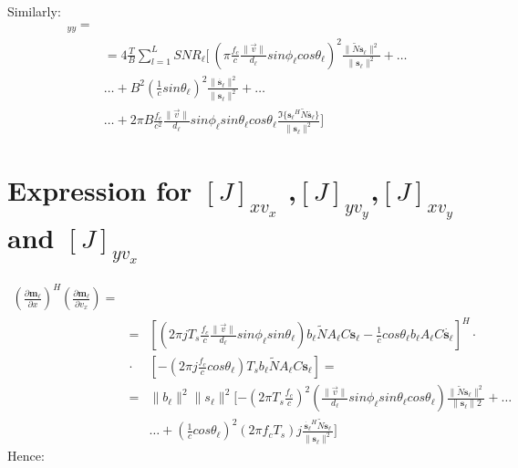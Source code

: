 Similarly:
\begin{eqnarray}
[J]_{y y} = \\
&= 4\frac{T}{B} \sum_{l=1}^{L}{SNR}_\ell  [\ \left( \pi \frac{f_c}{c}\frac{\|\vec{v}\|}{d_\ell }sin\phi_\ell  cos\theta_\ell  \right)^2 \frac{\|\tilde{N}\mathbf{s_\ell }\|^2}{\|\mathbf{s_\ell }\|^2}+ \dots \nonumber \\
&\dots+ B^2\left( \frac{1}{c} sin\theta_\ell  \right)^2 \frac{\|\mathbf{\dot{s_\ell }}\|^2}{\|\mathbf{s_\ell }\|^2} + \dots \nonumber \\
&\dots + 2 \pi B \frac{f_c}{c^2}\frac{\|\vec{v}\|}{d_\ell }sin\phi_\ell  sin\theta_\ell  cos \theta_\ell  \frac{\Im\{\mathbf{s_\ell }^H\tilde{N}\mathbf{\dot{s_\ell }}\}}{\|\mathbf{s_\ell }\|^2} ] \nonumber
\end{eqnarray}

\section{Expression for $[J]_{x v_x}$ ,$[J]_{y v_y}$,$[J]_{x v_y} $ and $[J]_{y v_x} $}
\begin{eqnarray}
\left(\frac{\partial \mathbf{m_\ell }}{\partial x} \right)^H \left(\frac{\partial \mathbf{m_\ell }}{\partial v_x} \right) = \\
&=&\left[(2 \pi j T_s \frac{f_c}{c} \frac{\|\vec{v}\|}{d_\ell } sin\phi_\ell  sin\theta_\ell )b_\ell  \tilde{N} A_\ell  C \mathbf{s_\ell } -\frac{1}{c}cos\theta_\ell  b_\ell  A_\ell  C \dot{\mathbf{s_\ell }}\right]^H \cdot \nonumber \\
&\cdot& \left[ -(2 \pi j \frac{f_c}{c} cos\theta_\ell ) T_s b_\ell  \tilde{N} A_\ell  C \mathbf{s_\ell } \right] = \nonumber \\
&=& \|b_\ell \|^2\|s_\ell \|^2 [ -\left(2 \pi T_s \frac{f_c}{c}\right)^2\left(\frac{\|\vec{v}\|}{d_\ell } sin \phi_\ell  sin \theta_\ell  cos \theta_\ell \right)\frac{\|\tilde{N}\mathbf{s_\ell }\|^2}{\|\mathbf{s_\ell }\|2} +\dots \nonumber\\
&&\dots +\left(\frac{1}{c}cos \theta_\ell \right)^2(2 \pi f_c T_s)j \frac{\mathbf{\dot{s_\ell }}^H\tilde{N}\mathbf{s_\ell }}{\|\mathbf{s_\ell }\|^2} ]
 \nonumber
\end{eqnarray}
Hence:
